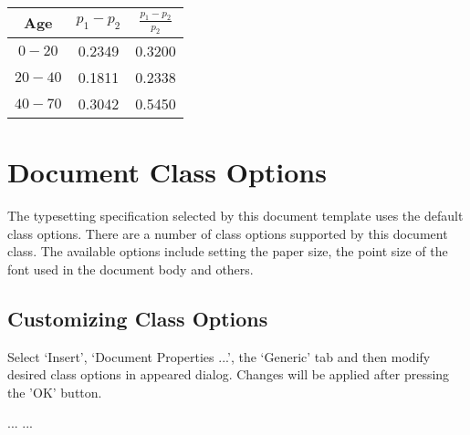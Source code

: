 \documentclass{article}
\begin{document}
\begin{table}[ht]
\begin{center}
\begin{tabular}{ccc}
  \hline
 Age & \(p_1 - p_2\) & \(\frac{p_1-p_2}{p_2}\) \\ 
  \hline
\(0-20\) & 0.2349 & 0.3200 \\ 
\(20-40\) & 0.1811 & 0.2338 \\ 
\(40-70\)& 0.3042 & 0.5450 \\ 
   \hline
\end{tabular}
\end{center}
\end{table}

\section{Document Class Options}
The typesetting specification selected by this document template
uses the default class options. There are a number of class options 
supported by this document class. The available options include 
setting the paper size, the point size of the font used in the 
document body and others.

\subsection{Customizing Class Options}
Select `Insert', `Document Properties ...', the `Generic' tab
and then modify desired class options in appeared dialog.
Changes will be applied after pressing the 'OK' button.

\begin{thebibliography}{99}
 ...
 ...
\end{thebibliography}
\end{document}
